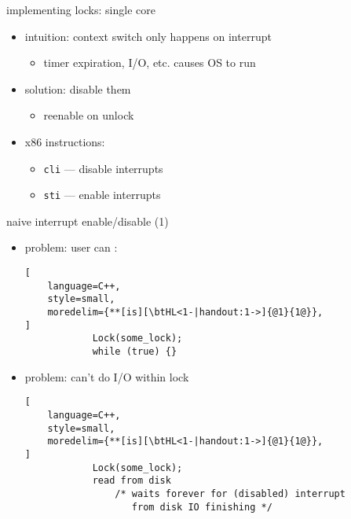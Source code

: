 \begin{frame}{implementing locks: single core}
    \begin{itemize}
    \item intuition: context switch only happens on interrupt
        \begin{itemize}
        \item timer expiration, I/O, etc. causes OS to run
        \end{itemize}
    \item solution: disable them
        \begin{itemize}
        \item reenable on unlock
        \end{itemize}
    \item<2-> x86 instructions:
        \begin{itemize}
        \item \texttt{cli} --- disable interrupts
        \item \texttt{sti} --- enable interrupts
        \end{itemize}
    \end{itemize}
\end{frame}

\begin{frame}[fragile,label=naiveEnableDisable1]{naive interrupt enable/disable (1)}
\begin{itemize}
\item<2-> problem: user can :
\begin{lstlisting}[
    language=C++,
    style=small,
    moredelim={**[is][\btHL<1-|handout:1->]{@1}{1@}},
]    
            Lock(some_lock);
            while (true) {}
\end{lstlisting}
\item<3-> problem: can't do I/O within lock
\begin{lstlisting}[
    language=C++,
    style=small,
    moredelim={**[is][\btHL<1-|handout:1->]{@1}{1@}},
]    
            Lock(some_lock);
            read from disk
                /* waits forever for (disabled) interrupt
                   from disk IO finishing */
\end{lstlisting}
\end{itemize}
\end{frame}


